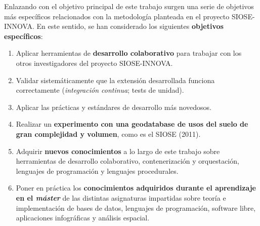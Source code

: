Enlazando con el objetivo principal de este trabajo surgen una serie de objetivos más específicos relacionados con la metodología planteada en el proyecto SIOSE-INNOVA. En este sentido, se han considerado los siguientes \textbf{objetivos específicos}:
\begin{enumerate}
\item Aplicar herramientas de \textbf{desarrollo colaborativo} para trabajar con los otros investigadores del proyecto SIOSE-INNOVA.
\item Validar sistemáticamente que la extensión desarrollada funciona correctamente (\textit{integración continua}; tests de unidad).
\item Aplicar las prácticas y estándares de desarrollo más novedosos.
\item Realizar un \textbf{experimento con una geodatabase de usos del suelo de gran complejidad y volumen}, como es el SIOSE (2011).
\item Adquirir \textbf{nuevos conocimientos} a lo largo de este trabajo sobre herramientas de desarrollo colaborativo, contenerización y orquestación, lenguajes de programación y lenguajes procedurales.
\item Poner en práctica los \textbf{conocimientos adquiridos durante el aprendizaje en el \textit{máster}} de las distintas asignaturas impartidas sobre teoría e implementación de bases de datos, lenguajes de programación, software libre, aplicaciones infográficas y análisis espacial.
\end{enumerate}





